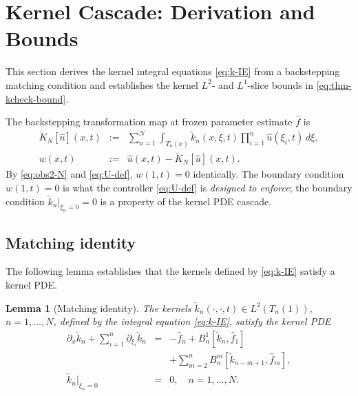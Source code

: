 \documentclass[journal,twoside,web]{ieeecolor}
\newtheorem{lemma}{Lemma}
\begin{document}
\section{Kernel Cascade: Derivation and Bounds}\label{sec:proof-kernel}

This section derives the kernel integral equations \eqref{eq:k-IE} from a backstepping matching condition and establishes the kernel $L^2$- and $L^1$-slice bounds in \eqref{eq:thm-kcheck-bound}.

The backstepping transformation map at frozen parameter estimate $\hat f$ is
\begin{eqnarray}
\check K_N[\hat u](x,t) &:=& \sum_{n=1}^N\int_{T_n(x)}\check k_n(x,\xi,t)\prod_{i=1}^n\hat u(\xi_i,t)\,d\xi, \nonumber\\
w(x,t) &:=& \hat u(x,t)-\check K_N[\hat u](x,t). \label{eq:K-formal}
\end{eqnarray}
By \eqref{eq:obs2-N} and \eqref{eq:U-def}, $w(1,t)=0$ identically. The boundary condition $w(1,t)=0$ is what the controller \eqref{eq:U-def} is \emph{designed to enforce}; the boundary condition $\check k_n|_{\xi_n=0}=0$ is a  property of the kernel PDE cascade.

\subsection{Matching identity}\label{sec:matching}

The following lemma establishes that the kernels defined by \eqref{eq:k-IE} satisfy a kernel PDE.

\begin{lemma}[Matching identity]\label{lem:matching}
The kernels $\check k_n(\cdot,\cdot,t)\in L^2(T_n(1))$, $n=1,\ldots,N$, defined by the integral equation \eqref{eq:k-IE}, satisfy the kernel PDE
\begin{eqnarray}
\partial_x\check k_n+\sum_{i=1}^n\partial_{\xi_i}\check k_n &=& -\hat f_n+B^1_n[\check k_n,\hat f_1] \nonumber\\
&& +\sum_{m=2}^n B^m_n[\check k_{n-m+1},\hat f_m], \nonumber\\
\check k_n|_{\xi_n=0} &=& 0,\quad n=1,\ldots,N. \label{eq:matching-PDE}
\end{eqnarray}
\end{lemma}
\end{document}
